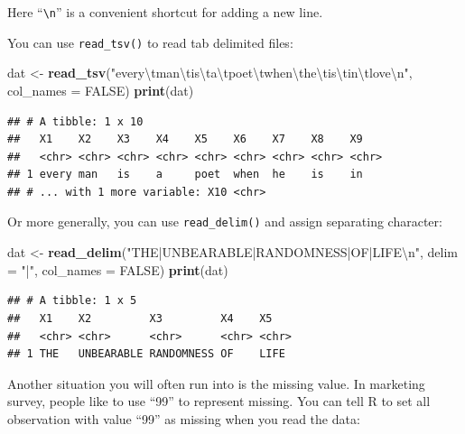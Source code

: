 \documentclass[12pt,]{krantz}
\makeatletter
\newenvironment{Shaded}{\begin{snugshade}}{\end{snugshade}}
\newcommand{\CharTok}[1]{\textcolor[rgb]{0.5,0.5,0.5}{#1}}
\newcommand{\DataTypeTok}[1]{\textcolor[rgb]{0.27,0.27,0.27}{#1}}
\newcommand{\KeywordTok}[1]{\textcolor[rgb]{0.27,0.27,0.27}{\textbf{#1}}}
\newcommand{\NormalTok}[1]{#1}
\newcommand{\OtherTok}[1]{\textcolor[rgb]{0.37,0.37,0.37}{#1}}
\newcommand{\StringTok}[1]{\textcolor[rgb]{0.5,0.5,0.5}{#1}}
\newenvironment{kframe}{%
\medskip{}
\setlength{\fboxsep}{.8em}
 \def\at@end@of@kframe{}%
 \ifinner\ifhmode%
  \def\at@end@of@kframe{\end{minipage}}%
  \begin{minipage}{\columnwidth}%
 \fi\fi%
 \def\FrameCommand##1{\hskip\@totalleftmargin \hskip-\fboxsep
 \colorbox{shadecolor}{##1}\hskip-\fboxsep
     \hskip-\linewidth \hskip-\@totalleftmargin \hskip\columnwidth}%
 \MakeFramed {\advance\hsize-\width
   \@totalleftmargin\z@ \linewidth\hsize
   \@setminipage}}%
 {\par\unskip\endMakeFramed%
 \at@end@of@kframe}
\renewenvironment{Shaded}{\begin{kframe}}{\end{kframe}}
\makeatother
\begin{document}
Here ``\texttt{\textbackslash{}n}'' is a convenient shortcut for adding a new line.

You can use \texttt{read\_tsv()} to read tab delimited files:

\begin{Shaded}
\begin{Highlighting}[]
\NormalTok{dat <-}\StringTok{ }\KeywordTok{read_tsv}\NormalTok{(}\StringTok{"every}\CharTok{\textbackslash{}t}\StringTok{man}\CharTok{\textbackslash{}t}\StringTok{is}\CharTok{\textbackslash{}t}\StringTok{a}\CharTok{\textbackslash{}t}\StringTok{poet}\CharTok{\textbackslash{}t}\StringTok{when}\CharTok{\textbackslash{}t}\StringTok{he}\CharTok{\textbackslash{}t}\StringTok{is}\CharTok{\textbackslash{}t}\StringTok{in}\CharTok{\textbackslash{}t}\StringTok{love}\CharTok{\textbackslash{}n}\StringTok{"}\NormalTok{, }
    \DataTypeTok{col_names =} \OtherTok{FALSE}\NormalTok{)}
\KeywordTok{print}\NormalTok{(dat)}
\end{Highlighting}
\end{Shaded}

\begin{verbatim}
## # A tibble: 1 x 10
##   X1    X2    X3    X4    X5    X6    X7    X8    X9   
##   <chr> <chr> <chr> <chr> <chr> <chr> <chr> <chr> <chr>
## 1 every man   is    a     poet  when  he    is    in   
## # ... with 1 more variable: X10 <chr>
\end{verbatim}

Or more generally, you can use \texttt{read\_delim()} and assign separating character:

\begin{Shaded}
\begin{Highlighting}[]
\NormalTok{dat <-}\StringTok{ }\KeywordTok{read_delim}\NormalTok{(}\StringTok{"THE|UNBEARABLE|RANDOMNESS|OF|LIFE}\CharTok{\textbackslash{}n}\StringTok{"}\NormalTok{, }
    \DataTypeTok{delim =} \StringTok{"|"}\NormalTok{, }\DataTypeTok{col_names =} \OtherTok{FALSE}\NormalTok{)}
\KeywordTok{print}\NormalTok{(dat)}
\end{Highlighting}
\end{Shaded}

\begin{verbatim}
## # A tibble: 1 x 5
##   X1    X2         X3         X4    X5   
##   <chr> <chr>      <chr>      <chr> <chr>
## 1 THE   UNBEARABLE RANDOMNESS OF    LIFE
\end{verbatim}

Another situation you will often run into is the missing value. In marketing survey, people like to use ``99'' to represent missing. You can tell R to set all observation with value ``99'' as missing when you read the data:
\end{document}

